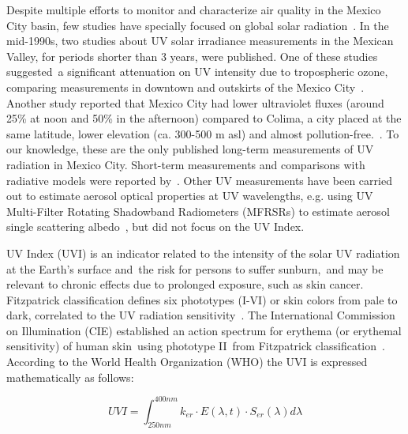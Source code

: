 \documentclass{article}
\begin{document}
Despite multiple efforts to monitor and characterize air quality in the
Mexico City basin, few studies have specially focused on global solar
radiation~\cite{valdes1991,Qui_ones_2014,Matsumoto_2014}. In the mid-1990s, two studies about UV
solar irradiance measurements in the Mexican Valley, for periods shorter
than 3 years, were published. One of these studies suggested~a
significant attenuation on UV intensity due to tropospheric ozone,
comparing measurements in downtown and outskirts of the Mexico
City~\cite{Acosta_2000}. Another study reported that Mexico City had
lower ultraviolet fluxes (around 25\% at noon and 50\% in the afternoon)
compared to Colima, a city placed at the same latitude, lower elevation
(ca. 300-500 m asl) and almost pollution-free.~\cite{Galindo_1995}. To
our knowledge, these are the only published long-term measurements of UV
radiation in Mexico City. Short-term measurements and comparisons with
radiative models were reported by~\cite{Palancar_2012}. Other UV
measurements have been carried out to estimate aerosol optical
properties at UV wavelengths, e.g. using UV Multi-Filter Rotating
Shadowband Radiometers (MFRSRs) to estimate aerosol single scattering
albedo~\cite{Goering_2005,Corr_2009}, but did not focus on the UV Index. ~

UV Index (UVI) is an indicator related to the intensity of the solar UV
radiation at the Earth's surface and~the risk for persons to suffer
sunburn,~and may be relevant to chronic effects due to prolonged
exposure, such as skin cancer. Fitzpatrick classification defines six
phototypes (I-VI) or skin colors from pale to dark, correlated to the UV
radiation sensitivity~\cite{kukita1974}. The International Commission
on Illumination (CIE) established an action spectrum for erythema (or
erythemal sensitivity) of human skin~using phototype II~from Fitzpatrick
classification~\cite{organization2014}. According to the World Health
Organization (WHO) the UVI is expressed mathematically as follows:

\begin{equation}
UVI=\int_{250nm}^{400nm}k_{er}\cdot E(\lambda,t)\cdot S_{er}\left(\lambda\right)d\lambda
\end{equation}
\end{document}
